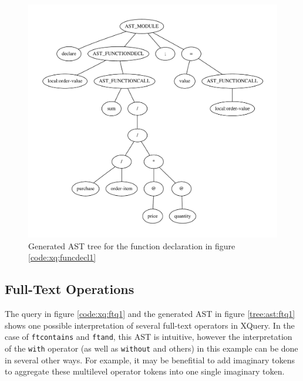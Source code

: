 \begin{figure}[h!]

\caption{Function declaration used to generate the AST in figure
\ref{tree:ast:funcdecl1}}
\label{code:xq:funcdecl1}
\centering
 \includegraphics[width=1\textwidth]{img/graphs/funcdecl1}
\caption{Generated AST tree for the function declaration in figure \ref{code:xq:funcdecl1}}
\label{tree:ast:funcdecl1}
\end{figure}

\pagebreak
\subsection{Full-Text Operations}
The query in figure \ref{code:xq:ftq1} and the generated AST in figure
\ref{tree:ast:ftq1} shows one possible interpretation of several full-text 
operators in XQuery. In the case of \verb!ftcontains! and \verb!ftand!, this AST
is intuitive, however the interpretation of the \verb!with! operator (as well
as \verb!without! and others) in this example can be done in several other ways.
For example, it may be benefitial to add imaginary tokens to aggregate these
multilevel operator tokens into one single imaginary token.

